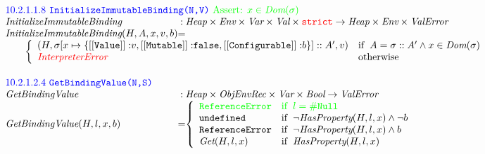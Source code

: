 \documentclass[a4paper, leqno]{amsart}
\newcommand{\rulesep}{\quad\quad}
\newcommand{\mkst}[2]{#1::#2}
\def\inred{\color{red}}
\def\inblue{\color{blue}}
\def\ingreen{\color{green}}
\newcommand{\strict}{{\inred\tt strict}}
\newcommand{\nullL}{{\tt \#Null}}
\newcommand{\undef}{{\tt undefined}}
\newcommand{\false}{{\tt false}}
\newcommand{\er}{\ensuremath{\sigma}}
\newcommand{\Bool}{\emph{Bool}}
\newcommand{\ve}{\emph{ValError}}
\newcommand{\ValError}{\emph{ValError}}
\newcommand{\re}{{\tt ReferenceError}}
\newcommand{\Val}{\emph{Val}}
\newcommand{\Loc}{\emph{Loc}}
\newcommand{\Heap}{\emph{Heap}}
\newcommand{\Var}{\emph{Var}}
\newcommand{\Env}{\emph{Env}}
\renewcommand{\lg}{{\tt \#Global}}
\newcommand{\hf}[1]{\emph{#1}}
\newcommand{\ifc}[1]{{\rm if}\begin{array}[t]{l}#1\end{array}}
\def\inred{\color{red}}
\def\inblue{\color{blue}}
\begin{document}
\[\begin{array}{l@{}c@{}l}
\multicolumn{3}{l}{\mbox{\inblue 10.2.1.1.8 {\tt InitializeImmutableBinding(N,V)}
{\ingreen Assert: $x\in\hf{Dom}(\er)$}}}\\
\hf{InitializeImmutableBinding} & :& \Heap \times \Env \times \Var \times \Val \times \strict \rightarrow \Heap \times \Env \times \ve \\
\hf{InitializeImmutableBinding}(H,A,x,v,b) & =\\
\multicolumn{3}{l}{
\rulesep
\left\{\begin{array}{ll}

(H, \mkst{\er[x\mapsto\{{\tt [[Value]]:}v, {\tt [[Mutable]]:}\false, {\tt [[Configurable]]:} b\}]}A', v)
&\ifc{A = \mkst{\er}A'\wedge x\in\hf{Dom}(\er)
}\\
{\inred \hf{InterpreterError}}
&\mbox{otherwise}\\
\end{array}\right.
}
\\[2em]


\multicolumn{3}{l}{\mbox{\inblue 10.2.1.2.4 {\tt GetBindingValue(N,S)}}}\\
\hf{GetBindingValue} & :& \Heap \times \emph{ObjEnvRec} \times \Var \times \Bool \rightarrow \ValError\\
\hf{GetBindingValue}(H,l,x,b) & =&
\left\{\begin{array}{ll}
\ingreen\re &\ingreen \ifc{l = \nullL}\\
\undef &\ifc{\neg\hf{HasProperty}(H,l,x) \wedge \neg b}\\
\re &\ifc{\neg\hf{HasProperty}(H,l,x) \wedge b}\\
\hf{Get}(H,l,x)&\ifc{\hf{HasProperty}(H,l,x)}\\
\end{array}\right.
\\[2em]


\end{array}\]
\end{document}
